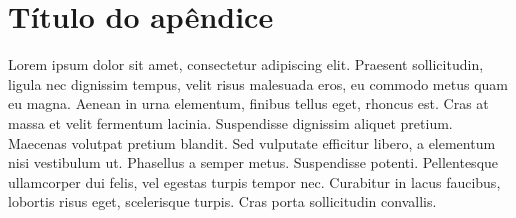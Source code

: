 %
%
%


\chapter{Título do apêndice}
\label{apend:titulo}

Lorem ipsum dolor sit amet, consectetur adipiscing elit. Praesent sollicitudin,
ligula nec dignissim tempus, velit risus malesuada eros, eu commodo metus quam
eu magna. Aenean in urna elementum, finibus tellus eget, rhoncus est. Cras at
massa et velit fermentum lacinia. Suspendisse dignissim aliquet pretium.
Maecenas volutpat pretium blandit. Sed vulputate efficitur libero, a elementum
nisi vestibulum ut. Phasellus a semper metus. Suspendisse potenti. Pellentesque
ullamcorper dui felis, vel egestas turpis tempor nec. Curabitur in lacus
faucibus, lobortis risus eget, scelerisque turpis. Cras porta sollicitudin
convallis.


